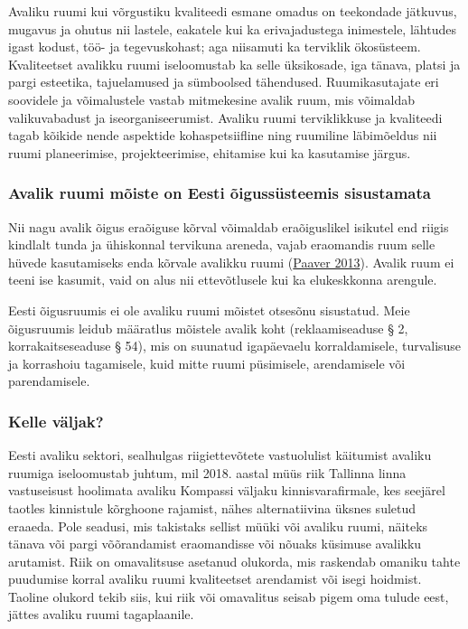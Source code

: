 \documentclass[estonian,]{article}
\begin{document}
Avaliku ruumi kui võrgustiku kvaliteedi esmane omadus on teekondade jätkuvus, mugavus ja ohutus nii lastele, eakatele kui ka erivajadustega inimestele, lähtudes igast kodust, töö- ja tegevuskohast; aga niisamuti ka terviklik ökosüsteem. Kvaliteetset avalikku ruumi iseloomustab ka selle üksikosade, iga tänava, platsi ja pargi esteetika, tajuelamused ja sümboolsed tähendused. Ruumikasutajate eri soovidele ja võimalustele vastab mitmekesine avalik ruum, mis võimaldab valikuvabadust ja iseorganiseerumist. Avaliku ruumi terviklikkuse ja kvaliteedi tagab kõikide nende aspektide kohaspetsiifline ning ruumiline läbimõeldus nii ruumi planeerimise, projekteerimise, ehitamise kui ka kasutamise järgus.

\hypertarget{avalik-ruumi-muxf5iste-on-eesti-uxf5igussuxfcsteemis-sisustamata}{%
\subsubsection*{Avalik ruumi mõiste on Eesti õigussüsteemis sisustamata}\label{avalik-ruumi-muxf5iste-on-eesti-uxf5igussuxfcsteemis-sisustamata}}

Nii nagu avalik õigus eraõiguse kõrval võimaldab eraõiguslikel isikutel end riigis kindlalt tunda ja ühiskonnal tervikuna areneda, vajab eraomandis ruum selle hüvede kasutamiseks enda kõrvale avalikku ruumi (\protect\hyperlink{Paaver2013}{Paaver 2013}). Avalik ruum ei teeni ise kasumit, vaid on alus nii ettevõtlusele kui ka elukeskkonna arengule.

Eesti õigusruumis ei ole avaliku ruumi mõistet otsesõnu sisustatud. Meie õigusruumis leidub määratlus mõistele avalik koht (reklaamiseaduse § 2, korrakaitseseaduse § 54), mis on suunatud igapäevaelu korraldamisele, turvalisuse ja korrashoiu tagamisele, kuid mitte ruumi püsimisele, arendamisele või parendamisele.

\hypertarget{kelle-vuxe4ljak}{%
\subsubsection{Kelle väljak?}\label{kelle-vuxe4ljak}}

Eesti avaliku sektori, sealhulgas riigiettevõtete vastuolulist käitumist avaliku ruumiga iseloomustab juhtum, mil 2018. aastal müüs riik Tallinna linna vastuseisust hoolimata avaliku Kompassi väljaku kinnisvarafirmale, kes seejärel taotles kinnistule kõrghoone rajamist, nähes alternatiivina üksnes suletud eraaeda. Pole seadusi, mis takistaks sellist müüki või avaliku ruumi, näiteks tänava või pargi võõrandamist eraomandisse või nõuaks küsimuse avalikku arutamist. Riik on omavalitsuse asetanud olukorda, mis raskendab omaniku tahte puudumise korral avaliku ruumi kvaliteetset arendamist või isegi hoidmist. Taoline olukord tekib siis, kui riik või omavalitus seisab pigem oma tulude eest, jättes avaliku ruumi tagaplaanile.
\end{document}
